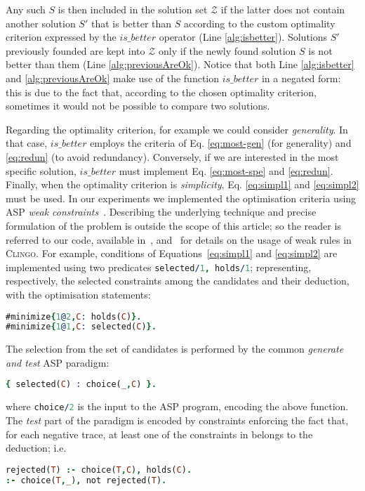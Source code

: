 Any such $S$ is then included in the solution set $\mathcal{Z}$ if the latter does not contain another solution $S'$ that is better than $S$ according to the custom optimality criterion expressed by the ${is\_better}$ operator (Line \ref{alg:isbetter}). Solutions $S'$ previously founded are kept into $\mathcal{Z}$ only if the newly found solution $S$ is not better than them (Line \ref{alg:previousAreOk}). Notice that both Line \ref{alg:isbetter} and \ref{alg:previousAreOk} make use of the function $is\_better$ in a negated form: this is due to the fact that, according to the chosen optimality criterion, sometimes it would not be possible to compare two solutions.

Regarding the optimality criterion, for example we could consider \emph{generality}. In that case, ${is\_better}$ employs the criteria of Eq. \eqref{eq:most-gen} (for generality) and \eqref{eq:redun} (to avoid redundancy). Conversely, if we are interested in the most specific solution, ${is\_better}$ must implement Eq. \eqref{eq:most-spe} and \eqref{eq:redun}.
Finally, when the optimality criterion is \emph{simplicity}, Eq. \eqref{eq:simpl1} and \eqref{eq:simpl2} must be used.
%
In our experiments we implemented the optimisation criteria using ASP \emph{weak constraints}~\cite{ASP:weak:2000}. Describing the underlying technique and precise formulation of the problem is outside the scope of this article; so the reader is referred to our code, available in~\cite{negdis:2021_5158528}, and~\cite{clingo:2019} for details on the usage of weak rules in \textsc{Clingo}. For example, conditions of Equations~\eqref{eq:simpl1} and \eqref{eq:simpl2} are implemented using two predicates \lstinline[language=prolog]$selected/1, holds/1$; representing, respectively, the selected constraints among the candidates and their deduction, with the optimisation statements:
\begin{lstlisting}[language=prolog]
#minimize{1@2,C: holds(C)}.
#minimize{1@1,C: selected(C)}.
\end{lstlisting}
%
The selection from the set of candidates is performed by the common \emph{generate and test} ASP paradigm:
%
\begin{lstlisting}[language=prolog]
{ selected(C) : choice(_,C) }.
\end{lstlisting}
%
where \lstinline[language=prolog]$choice/2$ is the input to the ASP program, encoding the above \textit{\sheriff} function. The \emph{test} part of the paradigm is encoded by constraints enforcing the fact that, for each negative trace, at least one of the constraints in \textit{\sheriff} belongs to the deduction; i.e.
%
\begin{lstlisting}[language=prolog]
rejected(T) :- choice(T,C), holds(C).
:- choice(T,_), not rejected(T).
\end{lstlisting}



